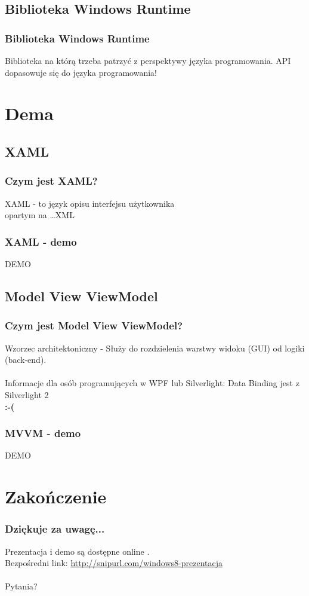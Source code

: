 \documentclass{beamer}
\begin{document}
\subsection{Biblioteka Windows Runtime}
\begin{frame}
\frametitle{Biblioteka Windows Runtime}
Biblioteka na którą trzeba patrzyć z perspektywy języka programowania. API dopasowuje się do języka programowania!
\end{frame}

\section{Dema}
\subsection{XAML}
\begin{frame}
\frametitle{Czym jest XAML?}
XAML - to język opisu interfejsu użytkownika\\ opartym na \ldots XML
\end{frame}

\begin{frame}
\frametitle{XAML - demo}
\begin{Huge}
DEMO
\end{Huge}
\end{frame}

\subsection{Model View ViewModel}
\begin{frame}
\frametitle{Czym jest Model View ViewModel?}
Wzorzec architektoniczny - Służy do rozdzielenia warstwy widoku (GUI) od logiki (back-end).\pause \\ 
\\
Informacje dla osób programujących w WPF lub Silverlight: Data Binding jest z Silverlight 2 \pause \\
\textbf{:-(}
\end{frame}

\begin{frame}
\frametitle{MVVM - demo}
\begin{Huge}
DEMO
\end{Huge}
\end{frame}
\section{Zakończenie}
\begin{frame}
\frametitle{Dziękuje za uwagę...}
Prezentacja i demo są dostępne online \href{http://github.com/soltys}{}. \\
Bezpośredni link: \href{http://snipurl.com/windows8-prezentacja}{http://snipurl.com/windows8-prezentacja}\\
\\
Pytania?
\end{frame}
\end{document}
